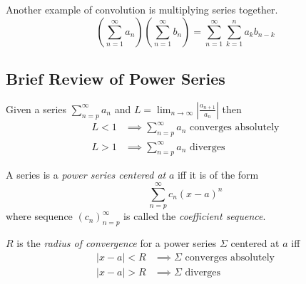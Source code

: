 \documentclass[notes]{subfiles}
\begin{document}
Another example of convolution is multiplying series together.
\[
    \left( \sum_{n = 1}^\infty a_n \right)\left( \sum_{n = 1}^\infty b_n \right) = \sum_{n = 1}^\infty \sum_{k = 1}^n a_k b_{n - k}
\]

\subsection{Brief Review of Power Series}

\begin{theorem} \label{ratio_cnvg_thm}
    Given a series $\sum_{n = p}^\infty a_n$ and $L = \lim_{n\to\infty} \left| \frac{a_{n + 1}}{a_n} \right|$ then
    \begin{align*}
        L < 1 &\implies \text{$\sum_{n = p}^\infty a_n$ converges absolutely} \\
        L > 1 &\implies \text{$\sum_{n = p}^\infty a_n$ diverges}
    \end{align*}
\end{theorem}


\begin{definition}
    A series is a \textsl{power series centered at} $a$ iff it is of the form
    \[
        \sum_{n = p}^\infty c_n(x - a)^n
    \]
    where sequence $(c_n)_{n = p}^\infty$ is called the \textsl{coefficient sequence}. 
\end{definition}

\begin{definition}
    $R$ is the \textsl{radius of convergence} for a power series $\Sigma$ centered at $a$ iff
    \begin{align*}
        |x - a| < R &\implies \text{$\Sigma$ converges absolutely} \\
        |x - a| > R &\implies \text{$\Sigma$ diverges}
    \end{align*}
\end{definition}
\end{document}
